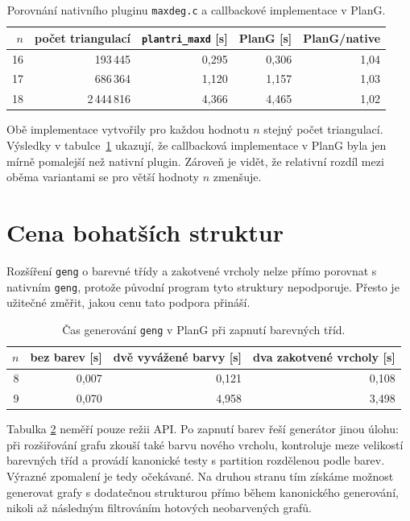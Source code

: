 \begin{table}[htbp]
\centering
\begin{tabular}{rrrrr}
\toprule
\(n\) & počet triangulací & \texttt{plantri\_maxd} [s] & PlanG [s] & PlanG/native \\
\midrule
16 & 193\,445     & 0{,}295 & 0{,}306 & 1{,}04 \\
17 & 686\,364     & 1{,}120 & 1{,}157 & 1{,}03 \\
18 & 2\,444\,816 & 4{,}366 & 4{,}465 & 1{,}02 \\
\bottomrule
\end{tabular}
\caption{Porovnání nativního pluginu \texttt{maxdeg.c} a callbackové implementace v PlanG.}
\label{tab:evaluation-plantri-maxdeg}
\end{table}

Obě implementace vytvořily pro každou hodnotu \(n\) stejný počet triangulací.
Výsledky v tabulce~\ref{tab:evaluation-plantri-maxdeg} ukazují, že callbacková
implementace v PlanG byla jen mírně pomalejší než nativní plugin. Zároveň je
vidět, že relativní rozdíl mezi oběma variantami se pro větší hodnoty \(n\)
zmenšuje.

\section{Cena bohatších struktur}
\label{sec:evaluation-colours}

Rozšíření \texttt{geng} o barevné třídy a zakotvené vrcholy nelze přímo
porovnat s nativním \texttt{geng}, protože původní program tyto struktury
nepodporuje. Přesto je užitečné změřit, jakou cenu tato podpora přináší.

\begin{table}[htbp]
\centering
\begin{tabular}{rrrr}
\toprule
\(n\) & bez barev [s] & dvě vyvážené barvy [s] & dva zakotvené vrcholy [s] \\
\midrule
8 & 0{,}007 & 0{,}121 & 0{,}108 \\
9 & 0{,}070 & 4{,}958 & 3{,}498 \\
\bottomrule
\end{tabular}
\caption{Čas generování \texttt{geng} v PlanG při zapnutí barevných tříd.}
\label{tab:evaluation-coloured-geng}
\end{table}

Tabulka \ref{tab:evaluation-coloured-geng} neměří pouze režii API. Po zapnutí
barev řeší generátor jinou úlohu: při rozšiřování grafu zkouší také barvu nového
vrcholu, kontroluje meze velikostí barevných tříd a provádí kanonické testy s
partition rozdělenou podle barev. Výrazné zpomalení je tedy očekávané. Na druhou
stranu tím získáme možnost generovat grafy s dodatečnou strukturou přímo během
kanonického generování, nikoli až následným filtrováním hotových neobarvených
grafů.

